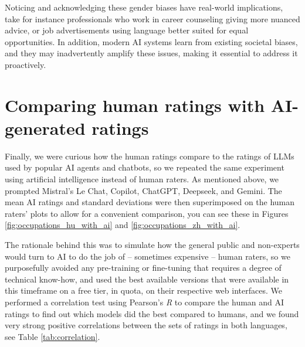\documentclass[11pt]{article}
\begin{document}



Noticing and acknowledging these gender biases have real-world implications, take for instance professionals who work in career counseling giving more nuanced advice, or job advertisements using language better suited for equal opportunities. In addition, modern AI systems learn from existing societal biases, and they may inadvertently amplify these issues, making it essential to address it proactively.

\section{Comparing human ratings with AI-generated ratings}

Finally, we were curious how the human ratings compare to the ratings of LLMs used by popular AI agents and chatbots, so we repeated the same experiment using artificial intelligence instead of human raters. As mentioned above, we prompted Mistral's Le Chat, Copilot, ChatGPT, Deepseek, and Gemini. The mean AI ratings and standard deviations were then superimposed on the human raters' plots to allow for a convenient comparison, you can see these in Figures \ref{fig:occupations_hu_with_ai} and \ref{fig:occupations_zh_with_ai}.

The rationale behind this was to simulate how the general public and non-experts would turn to AI to do the job of -- sometimes expensive -- human raters, so we purposefully avoided any pre-training or fine-tuning that requires a degree of technical know-how, and used the best available versions that were available in this timeframe on a free tier, in quota, on their respective web interfaces. We performed a correlation test using Pearson's \textit{R} to compare the human and AI ratings to find out which models did the best compared to humans, and we found very strong positive correlations between the sets of ratings in both languages, see Table \ref{tab:correlation}.

\end{document}
